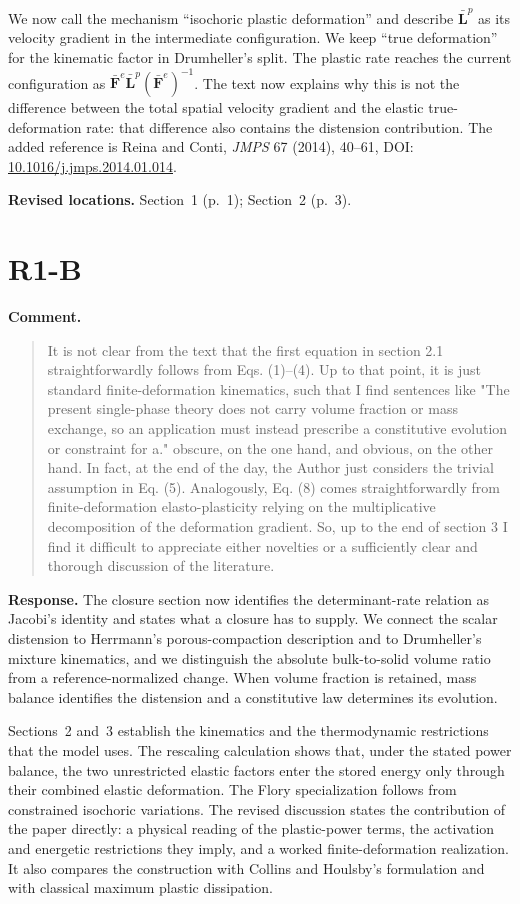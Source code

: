 \documentclass[11pt]{article}
\begin{document}
We now call the mechanism ``isochoric plastic deformation'' and describe
\(\bar{\mathbf L}^p\) as its velocity gradient in the intermediate
configuration. We keep ``true deformation'' for the kinematic factor in
Drumheller's split. The plastic rate reaches the current configuration as
\(\bar{\mathbf F}^e\bar{\mathbf L}^p(\bar{\mathbf F}^e)^{-1}\). The text now
explains why this is not the difference between the total spatial velocity
gradient and the elastic true-deformation rate: that difference also contains
the distension contribution. The added reference is Reina and Conti,
\emph{JMPS} 67 (2014), 40--61, DOI:
\href{https://doi.org/10.1016/j.jmps.2014.01.014}{10.1016/j.jmps.2014.01.014}.

\textbf{Revised locations.} Section~1 (p.~1); Section~2 (p.~3).
\section{R1-B}
\textbf{Comment.}\begin{quote}\small
It is not clear from the text that the first equation in section 2.1 straightforwardly follows from Eqs. (1)--(4). Up to that point, it is just standard finite-deformation kinematics, such that I find sentences like "The present single-phase theory does not carry volume fraction or mass exchange, so an application must instead prescribe a constitutive evolution or constraint for a." obscure, on the one hand, and obvious, on the other hand. In fact, at the end of the day, the Author just considers the trivial assumption in Eq. (5). Analogously, Eq. (8) comes straightforwardly from finite-deformation elasto-plasticity relying on the multiplicative decomposition of the deformation gradient. So, up to the end of section 3 I find it difficult to appreciate either novelties or a sufficiently clear and thorough discussion of the literature.
\end{quote}
\textbf{Response.} The closure section now identifies the determinant-rate
relation as Jacobi's identity and states what a closure has to supply. We
connect the scalar distension to Herrmann's porous-compaction description and
to Drumheller's mixture kinematics, and we distinguish the absolute
bulk-to-solid volume ratio from a reference-normalized change. When volume
fraction is retained, mass balance identifies the distension and a constitutive
law determines its evolution.

Sections~2 and~3 establish the kinematics and the thermodynamic restrictions
that the model uses. The rescaling calculation shows that, under the stated
power balance, the two unrestricted elastic factors enter the stored energy
only through their combined elastic deformation. The Flory specialization
follows from constrained isochoric variations. The revised discussion states
the contribution of the paper directly: a physical reading of the plastic-power
terms, the activation and energetic restrictions they imply, and a worked
finite-deformation realization. It also compares the construction with Collins
and Houlsby's formulation and with classical maximum plastic dissipation.
\end{document}
